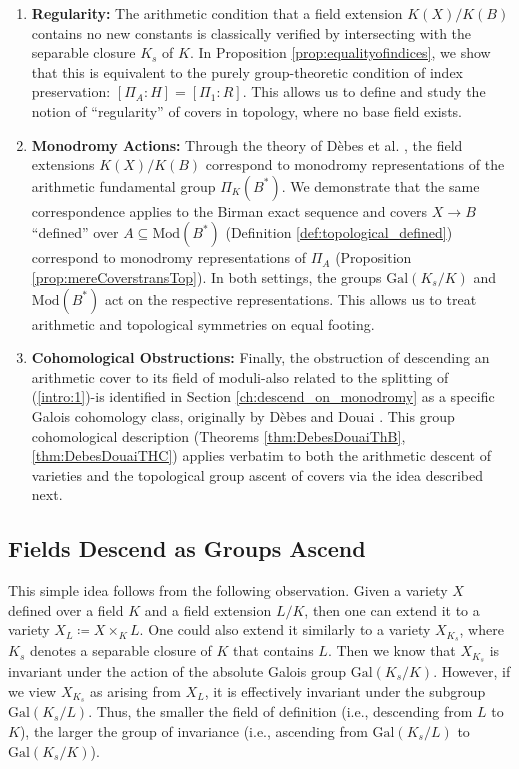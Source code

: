\documentclass[10pt]{amsart}
\theoremstyle{definition}
\newcommand{\Gal}{{ \mathrm{Gal}}}
\begin{document}
\begin{enumerate}
    \item \textbf{Regularity:} The arithmetic condition that a field extension $K(X)/K(B)$ contains no new constants is classically verified by intersecting with the separable closure $K_s$ of $K$. In Proposition \ref{prop:equalityofindices}, we show that this is equivalent to the purely group-theoretic condition of index preservation: $[\Pi_A : H] = [\Pi_1 : R]$. This allows us to define and study the notion of ``regularity'' of covers in topology, where no base field exists.
    
    \item \textbf{Monodromy Actions:} Through the theory of Dèbes et al. \cite{DebesDouai97,DebesEmsalem, MR1671938}, the field extensions $K(X)/K(B)$ correspond to monodromy representations of the arithmetic fundamental group $\Pi_K(B^*)$. We demonstrate that the same correspondence applies to the Birman exact sequence and covers $X\rightarrow B$ ``defined'' over $A\subseteq \mathrm{Mod}(B^*)$ (Definition \ref{def:topological_defined}) correspond to monodromy representations of $\Pi_A$ (Proposition \ref{prop:mereCoverstransTop}). In both settings, the groups $\Gal(K_s/K)$ and $\mathrm{Mod}(B^*)$ act on the respective representations. This allows us to treat arithmetic and topological symmetries on equal footing.
    
    \item \textbf{Cohomological Obstructions:} Finally, the obstruction of descending an arithmetic cover to its field of moduli-also related to the splitting of (\ref{intro:1})-is identified in Section \ref{ch:descend_on_monodromy} as a specific Galois cohomology class, originally by Dèbes and Douai \cite{DebesDouai97}. This group cohomological description (Theorems \ref{thm:DebesDouaiThB}, \ref{thm:DebesDouaiTHC}) applies verbatim to both the arithmetic descent of varieties and the topological group ascent of covers via the idea described next.
\end{enumerate}

\subsection*{Fields Descend as Groups Ascend}
This simple idea follows from the following observation. Given a variety $X$ defined over a field $K$ and a field extension $L/K$, then one can extend it to a variety $X_L \coloneqq X \times_K L $. One could also extend it similarly to a variety $X_{K_s}$, where $K_s$ denotes a separable closure of $K$ that contains $L$. Then we know that $X_{K_s}$ is invariant under the action of the absolute Galois group $\Gal(K_s/K)$. However, if we view $X_{K_s}$ as arising from $X_L$, it is effectively invariant under the subgroup $\Gal(K_s/L)$.
Thus, the smaller the field of definition (i.e., descending from $L$ to $K$), the larger the group of invariance (i.e., ascending from $\Gal(K_s/L)$ to $\Gal(K_s/K)$).
\end{document}
